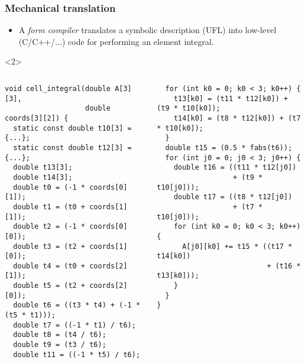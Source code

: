 \documentclass[presentation]{beamer}
\begin{document}
\begin{frame}[fragile]
  \frametitle{Mechanical translation}
  \begin{itemize}
  \item A \emph{form compiler} translates a symbolic description (UFL) into
    low-level (C/C++/...) code for performing an element integral.
  \end{itemize}
  \hspace{2em}
  \begin{uncoverenv}<2>
    \begin{columns}
      \begin{column}{0.5\textwidth}
\begin{verbatim}
void cell_integral(double A[3][3],
                   double coords[3][2]) {
  static const double t10[3] = {...};
  static const double t12[3] = {...};
  double t13[3];
  double t14[3];
  double t0 = (-1 * coords[0][1]);
  double t1 = (t0 + coords[1][1]);
  double t2 = (-1 * coords[0][0]);
  double t3 = (t2 + coords[1][0]);
  double t4 = (t0 + coords[2][1]);
  double t5 = (t2 + coords[2][0]);
  double t6 = ((t3 * t4) + (-1 * (t5 * t1)));
  double t7 = ((-1 * t1) / t6);
  double t8 = (t4 / t6);
  double t9 = (t3 / t6);
  double t11 = ((-1 * t5) / t6);
\end{verbatim}
      \end{column}
      \begin{column}{0.5\textwidth}
\begin{verbatim}
  for (int k0 = 0; k0 < 3; k0++) {
    t13[k0] = (t11 * t12[k0]) + (t9 * t10[k0]);
    t14[k0] = (t8 * t12[k0]) + (t7 * t10[k0]);
  }
  double t15 = (0.5 * fabs(t6));
  for (int j0 = 0; j0 < 3; j0++) {
    double t16 = ((t11 * t12[j0])
                  + (t9 * t10[j0]));
    double t17 = ((t8 * t12[j0])
                  + (t7 * t10[j0]));
    for (int k0 = 0; k0 < 3; k0++) {
      A[j0][k0] += t15 * ((t17 * t14[k0])
                          + (t16 * t13[k0]));
    }
  }
}
\end{verbatim}
      \end{column}
    \end{columns}
  \end{uncoverenv}
\end{frame}
\end{document}

